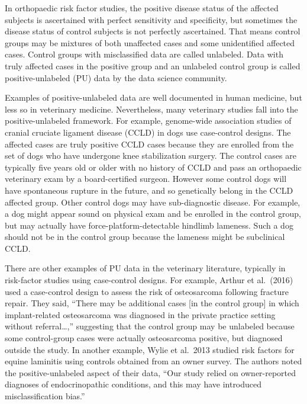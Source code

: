 \documentclass[
]{article}
\begin{document}
In orthopaedic risk factor studies, the positive disease status of the
affected subjects is ascertained with perfect sensitivity and
specificity, but sometimes the disease status of control subjects is not
perfectly ascertained. That means control groups may be mixtures of both
unaffected cases and some unidentified affected cases. Control groups
with misclassified data are called unlabeled. Data with truly affected
cases in the positive group and an unlabeled control group is called
positive-unlabeled (PU) data by the data science community.

Examples of positive-unlabeled data are well documented in human
medicine, but less so in veterinary medicine. Nevertheless, many
veterinary studies fall into the positive-unlabeled framework. For
example, genome-wide association studies of cranial cruciate ligament
disease (CCLD) in dogs use case-control designs. The affected cases are
truly positive CCLD cases because they are enrolled from the set of dogs
who have undergone knee stabilization surgery. The control cases are
typically five years old or older with no history of CCLD and pass an
orthopaedic veterinary exam by a board-certified surgeon. However some
control dogs will have spontaneous rupture in the future, and so
genetically belong in the CCLD affected group. Other control dogs may
have sub-diagnostic disease. For example, a dog might appear sound on
physical exam and be enrolled in the control group, but may actually
have force-platform-detectable hindlimb lameness. Such a dog should not
be in the control group because the lameness might be subclinical
CCLD.\cite{wrehim08}

There are other examples of PU data in the veterinary literature,
typically in risk-factor studies using case-control designs. For
example, Arthur et al.~(2016) used a case-control design to assess the
risk of osteosarcoma following fracture repair.\cite{aakj16} They said,
``There may be additional cases {[}in the control group{]} in which
implant-related osteosarcoma was diagnosed in the private practice
setting without referral\ldots,'' suggesting that the control group may
be unlabeled because some control-group cases were actually osteosarcoma
positive, but diagnosed outside the study. In another example, Wylie et
al.~2013 studied risk factors for equine laminitis using controls
obtained from an owner survey.\cite{wcvj13} The authors noted the
positive-unlabeled aspect of their data, ``Our study relied on
owner-reported diagnoses of endocrinopathic conditions, and this may
have introduced misclassification bias.''
\end{document}
